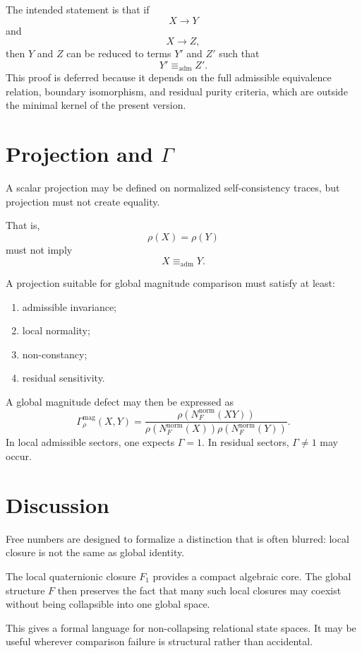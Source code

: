 \documentclass[11pt]{article}
\begin{document}
The intended statement is that if
\[
X\to Y
\]
and
\[
X\to Z,
\]
then $Y$ and $Z$ can be reduced to terms $Y'$ and $Z'$ such that
\[
Y'\equiv_{\mathrm{adm}} Z'.
\]
This proof is deferred because it depends on the full admissible equivalence relation, boundary isomorphism, and residual purity criteria, which are outside the minimal kernel of the present version.

\section{Projection and \texorpdfstring{$\Gamma$}{Gamma}}

A scalar projection may be defined on normalized self-consistency traces, but projection must not create equality.

That is,
\[
\rho(X)=\rho(Y)
\]
must not imply
\[
X\equiv_{\mathrm{adm}}Y.
\]

A projection suitable for global magnitude comparison must satisfy at least:
\begin{enumerate}
  \item admissible invariance;
  \item local normality;
  \item non-constancy;
  \item residual sensitivity.
\end{enumerate}

A global magnitude defect may then be expressed as
\[
\Gamma_\rho^{\mathrm{mag}}(X,Y)=\frac{\rho(N_F^{\mathrm{norm}}(XY))}{\rho(N_F^{\mathrm{norm}}(X))\rho(N_F^{\mathrm{norm}}(Y))}.
\]
In local admissible sectors, one expects $\Gamma=1$. In residual sectors, $\Gamma\neq1$ may occur.

\section{Discussion}

Free numbers are designed to formalize a distinction that is often blurred: local closure is not the same as global identity.

The local quaternionic closure $F_1$ provides a compact algebraic core. The global structure $F$ then preserves the fact that many such local closures may coexist without being collapsible into one global space.

This gives a formal language for non-collapsing relational state spaces. It may be useful wherever comparison failure is structural rather than accidental.
\end{document}

